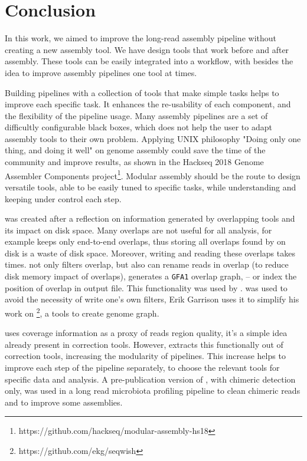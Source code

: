 \documentclass[main.tex]{subfiles}
\begin{document}
\chapter{Conclusion}

In this work, we aimed to improve the long-read assembly pipeline without creating a new assembly tool. We have design tools that work before and after assembly. These tools can be easily integrated into a workflow, with besides the idea to improve assembly pipelines one tool at times.

Building pipelines with a collection of tools that make simple tasks helps to improve each specific task. It enhances the re-usability of each component, and the flexibility of the pipeline usage. Many assembly pipelines are a set of difficultly configurable black boxes, which does not help the user to adapt assembly tools to their own problem. Applying UNIX philosophy "Doing only one thing, and doing it well" on genome assembly could save the time of the community and improve results, as shown in the Hackseq 2018 Genome Assembler Components project\footnote{https://github.com/hackseq/modular-assembly-hs18}. Modular assembly should be the route to design versatile tools, able to be easily tuned to specific tasks, while understanding and keeping under control each step.

\fpa was created after a reflection on information generated by overlapping tools and its impact on disk space. Many overlaps are not useful for all analysis, for example \miniasm keeps only end-to-end overlaps, thus storing all overlaps found by \minimap on disk is a waste of disk space. Moreover, writing and reading these overlaps takes times. \fpa not only filters overlap, but also can rename reads in overlap (to reduce disk memory impact of overlaps), generates a \texttt{GFA1} overlap graph, -- or index the position of overlap in output file. This functionality was used by \consent \cite{CONSENT}. \fpa was used to avoid the necessity of write one's own filters, Erik Garrison uses it to simplify his work on \footnote{https://github.com/ekg/seqwish}, a tools to create genome graph.

\yacrd uses coverage information as a proxy of reads region quality, it's a simple idea already present in correction tools. However, \yacrd extracts this functionally out of correction tools, increasing the modularity of pipelines. This increase helps to improve each step of the pipeline separately, to choose the relevant tools for specific data and analysis. A pre-publication version of \yacrd, with chimeric detection only, was used in a long read microbiota profiling pipeline to clean chimeric reads \cite{cite_yacrd} and to improve some \flye assemblies. 
\end{document}
